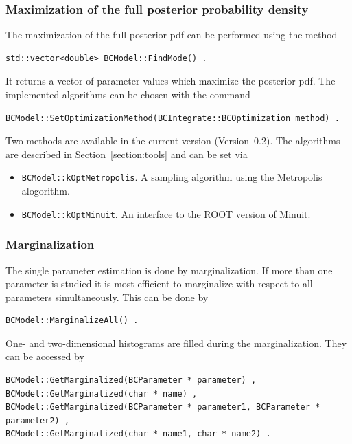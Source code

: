 \documentclass[11pt, a4paper]{article}
\newcommand{\versionno}{0.2}
\newcommand{\Version}{Version~\versionno}
\begin{document}

\subsubsection{Maximization of the full posterior probability density} 

The maximization of the full posterior pdf can be performed using the
method
%
\begin{verbatim} 
std::vector<double> BCModel::FindMode() . 
\end{verbatim} 

\noindent 
It returns a vector of parameter values which maximize the posterior
pdf. The implemented algorithms can be chosen with the command
%
\begin{verbatim}
BCModel::SetOptimizationMethod(BCIntegrate::BCOptimization method) .
\end{verbatim}
%
Two methods are available in the current version (\Version). The
algorithms are described in Section~\ref{section:tools} and can be set
via
%
\begin{itemize}
\item \verb|BCModel::kOptMetropolis|. A sampling algorithm using the
  Metropolis alogorithm.
\item \verb|BCModel::kOptMinuit|. An interface to the ROOT version of Minuit.
\end{itemize}


\subsubsection{Marginalization} 

\noindent 
The single parameter estimation is done by marginalization. If more
than one parameter is studied it is most efficient to marginalize with
respect to all parameters simultaneously. This can be done by
%
\begin{verbatim}
BCModel::MarginalizeAll() . 
\end{verbatim} 

\noindent 
One- and two-dimensional histograms are filled during the
marginalization. They can be accessed by
%
\begin{verbatim}
BCModel::GetMarginalized(BCParameter * parameter) ,
BCModel::GetMarginalized(char * name) ,
BCModel::GetMarginalized(BCParameter * parameter1, BCParameter * parameter2) ,
BCModel::GetMarginalized(char * name1, char * name2) .
\end{verbatim}
\end{document}
